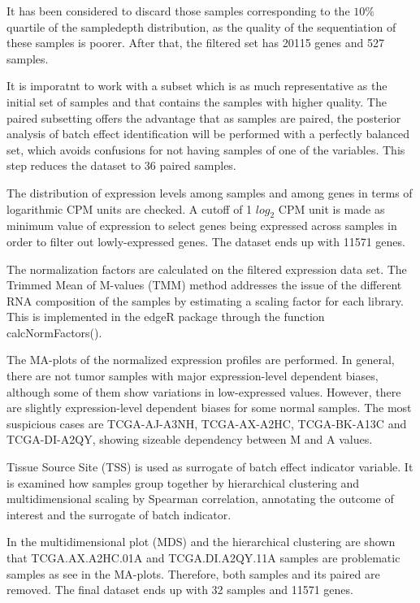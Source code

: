 \documentclass[9pt,twocolumn,twoside]{gsajnl}
\begin{document}
It has been considered to discard those samples corresponding to the $ 10\% $ quartile of the sampledepth distribution, as the quality of the sequentiation of these samples is poorer. After that, the filtered set has 20115 genes and 527 samples.

It is imporatnt to work with a subset which is as much representative as the initial set of samples and that contains the samples with higher quality. The paired subsetting offers the advantage that as samples are paired, the posterior analysis of batch effect identification will be performed with a perfectly balanced set, which avoids confusions for not having samples of one of the variables. This step reduces the dataset to 36 paired samples.

The distribution of expression levels among samples and among genes in terms of logarithmic CPM units are checked. A cutoff of 1 $log_{2}$ CPM unit is made as minimum value of expression to select genes being expressed across samples in order to filter out lowly-expressed genes. The dataset ends up with 11571 genes.

The normalization factors are calculated on the filtered expression data set. The Trimmed Mean of M-values (TMM) method addresses the issue of the different RNA composition of the samples by estimating a scaling factor for each library. This is implemented in the edgeR package \citep{Robinson2010b} through the function calcNormFactors().

The MA-plots of the normalized expression profiles are performed. In general, there are not tumor samples with major expression-level dependent biases, although some of them show variations in low-expressed values. However, there are slightly expression-level dependent biases for some normal samples. The most suspicious cases are TCGA-AJ-A3NH, TCGA-AX-A2HC, TCGA-BK-A13C and TCGA-DI-A2QY, showing sizeable dependency between M and A values. 

Tissue Source Site (TSS) is used as surrogate of batch effect indicator variable. It is examined how samples group together by hierarchical clustering and multidimensional scaling by Spearman correlation, annotating the outcome of interest and the surrogate of batch indicator.

In the multidimensional plot (MDS) and the hierarchical clustering are shown that TCGA.AX.A2HC.01A and TCGA.DI.A2QY.11A samples are problematic samples as see in the MA-plots. Therefore, both samples and its paired are removed. The final dataset ends up with 32 samples and 11571 genes.
\end{document}
